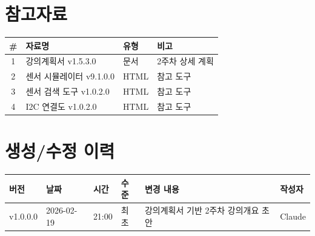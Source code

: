 \documentclass[11pt, a4paper]{article}
\begin{document}
\section*{참고자료}

\begin{table}[H]\centering
\begin{tabular}{clll}\toprule
\textbf{\#} & \textbf{자료명} & \textbf{유형} & \textbf{비고} \\\midrule
1 & 강의계획서 v1.5.3.0 & 문서 & 2주차 상세 계획 \\
2 & 센서 시뮬레이터 v9.1.0.0 & HTML & 참고 도구 \\
3 & 센서 검색 도구 v1.0.2.0 & HTML & 참고 도구 \\
4 & I2C 연결도 v1.0.2.0 & HTML & 참고 도구 \\
\bottomrule
\end{tabular}
\end{table}

\section*{생성/수정 이력}

\begin{table}[H]\centering
\begin{tabular}{llllll}\toprule
\textbf{버전} & \textbf{날짜} & \textbf{시간} & \textbf{수준} & \textbf{변경 내용} & \textbf{작성자} \\\midrule
v1.0.0.0 & 2026-02-19 & 21:00 & 최초 & 강의계획서 기반 2주차 강의개요 초안 & Claude \\
\bottomrule
\end{tabular}
\end{table}
\end{document}
